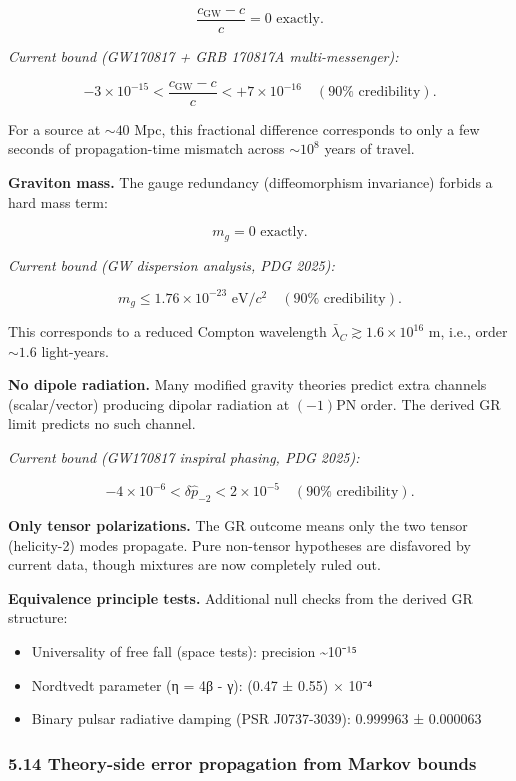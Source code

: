 \[
\frac{c_{\mathrm{GW}} - c}{c} = 0 \text{ exactly.}
\]

\emph{Current bound (GW170817 + GRB 170817A multi-messenger):}

\[
-3 \times 10^{-15} < \frac{c_{\mathrm{GW}} - c}{c} < +7 \times 10^{-16}
\quad (90\% \text{ credibility}).
\]

For a source at \(\sim 40\) Mpc, this fractional difference corresponds to only a few seconds of propagation-time mismatch across \(\sim 10^8\) years of travel.

\textbf{Graviton mass.} The gauge redundancy (diffeomorphism invariance) forbids a hard mass term:

\[
m_g = 0 \text{ exactly.}
\]

\emph{Current bound (GW dispersion analysis, PDG 2025):}

\[
m_g \le 1.76 \times 10^{-23} \text{ eV}/c^2 \quad (90\% \text{ credibility}).
\]

This corresponds to a reduced Compton wavelength \(\bar{\lambda}_C \gtrsim 1.6 \times 10^{16}\) m, i.e., order \(\sim 1.6\) light-years.

\textbf{No dipole radiation.} Many modified gravity theories predict extra channels (scalar/vector) producing dipolar radiation at \((-1)\)PN order. The derived GR limit predicts no such channel.

\emph{Current bound (GW170817 inspiral phasing, PDG 2025):}

\[
-4 \times 10^{-6} < \delta\hat{p}_{-2} < 2 \times 10^{-5}
\quad (90\% \text{ credibility}).
\]

\textbf{Only tensor polarizations.} The GR outcome means only the two tensor (helicity-2) modes propagate. Pure non-tensor hypotheses are disfavored by current data, though mixtures are now completely ruled out.

\textbf{Equivalence principle tests.} Additional null checks from the derived GR structure:

\begin{itemize}
\tightlist
\item
  Universality of free fall (space tests): precision \textasciitilde10⁻¹⁵
\item
  Nordtvedt parameter (η = 4β - γ): (0.47 ± 0.55) × 10⁻⁴
\item
  Binary pulsar radiative damping (PSR J0737-3039): 0.999963 ± 0.000063
\end{itemize}

\subsubsection{5.14 Theory-side error propagation from Markov bounds}\label{514-theory-side-error-propagation-from-markov-bounds}

